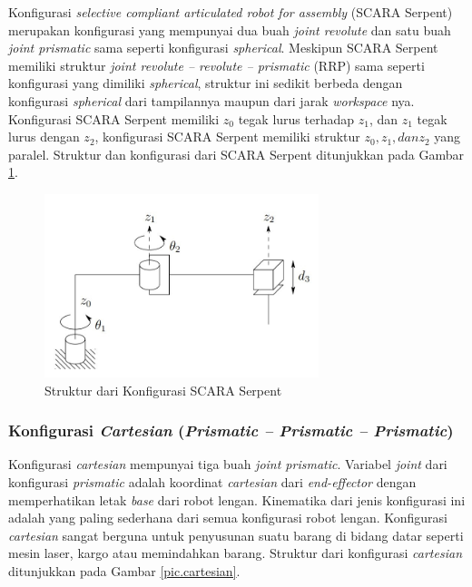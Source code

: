 Konfigurasi \textit{selective compliant articulated robot for assembly} (SCARA Serpent) merupakan konfigurasi yang mempunyai dua buah \textit{joint revolute} dan satu buah \textit{joint prismatic} sama seperti konfigurasi \textit{spherical}. Meskipun SCARA Serpent memiliki struktur \textit{joint revolute – revolute – prismatic} (RRP) sama seperti konfigurasi yang dimiliki \textit{spherical}, struktur ini sedikit berbeda dengan konfigurasi \textit{spherical} dari tampilannya maupun dari jarak \textit{workspace} nya. Konfigurasi SCARA Serpent memiliki $z_{0}$ tegak lurus terhadap $z_{1}$, dan $z_{1}$ tegak lurus dengan $z_{2}$, konfigurasi SCARA Serpent memiliki struktur $z_{0}, z_{1}, dan z_{2}$ yang paralel. Struktur dan konfigurasi dari SCARA Serpent ditunjukkan pada Gambar \ref{pic.SCARA}.
\begin{figure}[H]
	\centering
	\label{pic.SCARA}
	\includegraphics[width=8cm]{gambar/SCARA.jpg}
	\caption{Struktur dari Konfigurasi SCARA Serpent\cite{Spong2006}}
	
\end{figure}


\subsubsection{Konfigurasi \textit{Cartesian} (\textit{Prismatic – Prismatic – Prismatic})  } 

Konfigurasi \textit{cartesian} mempunyai tiga buah \textit{joint prismatic}. Variabel \textit{joint} dari konfigurasi \textit{prismatic} adalah koordinat \textit{cartesian} dari \textit{end-effector} dengan memperhatikan letak \textit{base} dari robot lengan. Kinematika dari jenis konfigurasi ini adalah yang paling sederhana dari semua konfigurasi robot lengan. Konfigurasi \textit{cartesian} sangat berguna untuk penyusunan suatu barang di bidang datar seperti mesin laser, kargo atau memindahkan barang. Struktur dari konfigurasi \textit{cartesian} ditunjukkan pada Gambar \ref{pic.cartesian}.

